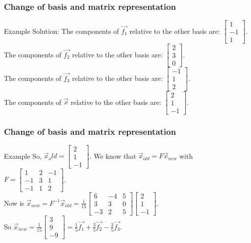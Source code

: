 \begin{frame}
	\frametitle{Change of basis and matrix representation}
	\begin{block}{Example}
		Solution: The components of $\overrightarrow{f_1}$ relative to the other basis are: $\begin{bmatrix} 1\\-1\\1\end{bmatrix}$.\\
		The components of $\overrightarrow{f_2}$ relative to the other basis are: $\begin{bmatrix} 2\\3\\0\end{bmatrix}$.\\
		The components of $\overrightarrow{f_3}$ relative to the other basis are: $\begin{bmatrix} -1\\1\\2\end{bmatrix}$.\\
		The components of $\overrightarrow{x}$ relative to the other basis are: $\begin{bmatrix} 2\\1\\-1\end{bmatrix}$.
	\end{block}
\end{frame}

\begin{frame}
	\frametitle{Change of basis and matrix representation}
	\begin{block}{Example}
		So, $\overrightarrow{x}_old=\begin{bmatrix} 2\\1\\-1\end{bmatrix}$. We know that $\overrightarrow{x}_{old}=F\overrightarrow{x}_{new}$ with $F=\begin{bmatrix}
		1 & 2 & -1 \\
		-1 & 3 & 1\\
		-1 & 1 & 2
		\end{bmatrix}$.\\
		Now is $\overrightarrow{x}_{new}=F^{-1}\overrightarrow{x}_{old}=
		\frac{1}{15} \begin{bmatrix} 
		6 & -4 & 5\\
		3 & 3 & 0\\
		-3 & 2 & 5\end{bmatrix} \begin{bmatrix}
		2\\1\\-1
		\end{bmatrix}$.\\
		So $\overrightarrow{x}_{new}=\frac{1}{15} \begin{bmatrix}
		3\\9\\-9
		\end{bmatrix}= \frac{1}{5} \overrightarrow{f_1}+\frac{3}{5}\overrightarrow{f_2}-\frac{3}{5} \overrightarrow{f_3}$.
	\end{block}
\end{frame}


